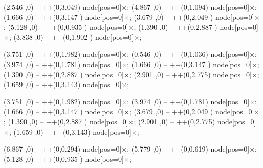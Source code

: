 \documentclass[fleqn]{beamer}
\begin{document}
\begin{zframe}{}
\begin{scope}[x=1cm,y=1cm,shift=(scope),thick]
   (2.546 ,0) -- ++(0,3.049) node[pos=0]{$\mathbf{\times}$};
   (4.867 ,0) -- ++(0,1.094) node[pos=0]{$\mathbf{\times}$};
   (1.666 ,0) -- ++(0,3.147 ) node[pos=0]{$\mathbf{\times}$};
   (3.679 ,0) -- ++(0,2.049 ) node[pos=0]{$\mathbf{\times}$};
   (5.128 ,0) -- ++(0,0.935 ) node[pos=0]{$\mathbf{\times}$};
   (1.390 ,0) -- ++(0,2.887 ) node[pos=0]{$\mathbf{\times}$};
   (3.838 ,0) -- ++(0,1.902 ) node[pos=0]{$\mathbf{\times}$};
                                                                            
   (3.751 ,0) -- ++(0,1.982) node[pos=0]{$\mathbf{\times}$};
   (0.546 ,0) -- ++(0,1.036) node[pos=0]{$\mathbf{\times}$};
   (3.974 ,0) -- ++(0,1.781) node[pos=0]{$\mathbf{\times}$};
   (1.666 ,0) -- ++(0,3.147 ) node[pos=0]{$\mathbf{\times}$};
   (1.390 ,0) -- ++(0,2.887 ) node[pos=0]{$\mathbf{\times}$};
   (2.901 ,0) -- ++(0,2.775) node[pos=0]{$\mathbf{\times}$};
   (1.659 ,0) -- ++(0,3.143) node[pos=0]{$\mathbf{\times}$};
                                                                             
   (3.751 ,0) -- ++(0,1.982) node[pos=0]{$\mathbf{\times}$};
   (3.974 ,0) -- ++(0,1.781) node[pos=0]{$\mathbf{\times}$};
   (1.666 ,0) -- ++(0,3.147 ) node[pos=0]{$\mathbf{\times}$};
   (3.679 ,0) -- ++(0,2.049 ) node[pos=0]{$\mathbf{\times}$};
   (1.390 ,0) -- ++(0,2.887 ) node[pos=0]{$\mathbf{\times}$};
   (2.901 ,0) -- ++(0,2.775) node[pos=0]{$\mathbf{\times}$};
   (1.659 ,0) -- ++(0,3.143) node[pos=0]{$\mathbf{\times}$};
                                                                              
   (6.867 ,0) -- ++(0,0.294) node[pos=0]{$\mathbf{\times}$};
   (5.779 ,0) -- ++(0,0.619) node[pos=0]{$\mathbf{\times}$};
   (5.128 ,0) -- ++(0,0.935 ) node[pos=0]{$\mathbf{\times}$};
                                                                            

\end{scope}
\end{zframe}
\end{document}
